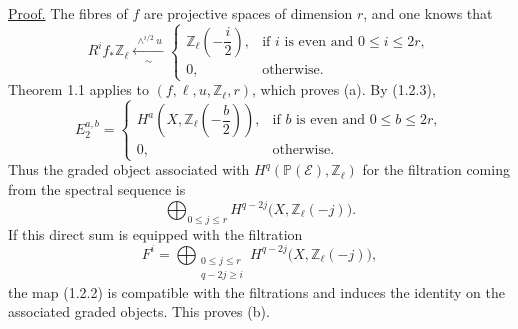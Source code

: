 \noindent\underline{Proof.}
The fibres of $f$ are projective spaces of dimension $r$, and one knows that
\begin{equation}\tag{1.2.3}
R^if_*\mathbb Z_\ell
\xleftarrow[\ \sim\ ]{\ \wedge^{i/2}u\ }
\begin{cases}
\mathbb Z_\ell\left(-\dfrac{i}{2}\right),
  & \text{if $i$ is even and $0\leq i\leq2r$},\\[2ex]
0, & \text{otherwise}.
\end{cases}
\end{equation}
Theorem 1.1 applies to $(f,\ell,u,\mathbb Z_\ell,r)$, which proves (a).
By (1.2.3),
\begin{equation}\tag{1.2.4}
E_2^{a,b}=
\begin{cases}
H^a\left(X,\mathbb Z_\ell\left(-\dfrac b2\right)\right),
  & \text{if $b$ is even and $0\leq b\leq2r$},\\[2ex]
0, & \text{otherwise}.
\end{cases}
\end{equation}
Thus the graded object associated with
$H^q(\mathbb P(\mathcal E),\mathbb Z_\ell)$ for the filtration coming
from the spectral sequence is
\[
\bigoplus_{0\leq j\leq r}
H^{q-2j}\bigl(X,\mathbb Z_\ell(-j)\bigr).
\]
If this direct sum is equipped with the filtration
\[
F^i=
\bigoplus_{\substack{0\leq j\leq r\\q-2j\geq i}}
H^{q-2j}\bigl(X,\mathbb Z_\ell(-j)\bigr),
\]
the map (1.2.2) is compatible with the filtrations and induces the identity on
the associated graded objects. This proves (b).


